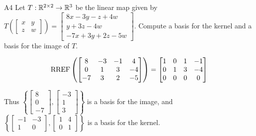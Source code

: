 \documentclass{sbgLAsemi}
\begin{document}
\begin{problem}{A4}
Let $T: \mathbb{R}^{2\times 2} \rightarrow \mathbb{R}^3$ be the linear map given by $T\left(\begin{bmatrix} x & y \\ z & w \end{bmatrix} \right) = \begin{bmatrix}  8x-3y-z+4w \\ y+3z-4w \\ -7x+3y+2z-5w\end{bmatrix} $.
Compute a basis for the kernel and a basis for the image of $T$.
\end{problem}
\begin{solution}
$$\operatorname{RREF} \left( \begin{bmatrix} 8 & -3 & -1 & 4 \\ 0 & 1 & 3 & -4 \\ -7 & 3 & 2 & -5 \end{bmatrix} \right) = \begin{bmatrix} 1 & 0 & 1 & -1 \\ 0 & 1 & 3 & -4 \\ 0 & 0 & 0 & 0 \end{bmatrix}$$

Thus \(\left\{ \begin{bmatrix} 8 \\ 0 \\ -7 \end{bmatrix}, \begin{bmatrix} -3 \\ 1 \\ 3 \end{bmatrix} \right\}\) is a basis for the image, and \( \left\{ \begin{bmatrix} -1 & -3 \\ 1 & 0 \end{bmatrix}, \begin{bmatrix} 1 & 4 \\ 0 & 1 \end{bmatrix} \right\} \) is a basis for the kernel.
\end{solution}
\end{document}
